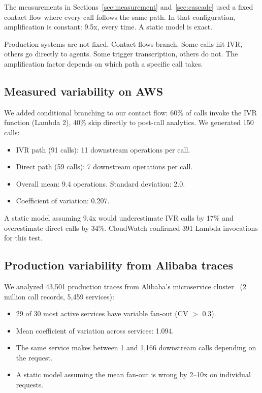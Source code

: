 \documentclass{article}
\begin{document}
The measurements in Sections~\ref{sec:measurement} and~\ref{sec:cascade} used a fixed contact flow where every call follows the same path. In that configuration, amplification is constant: 9.5x, every time. A static model is exact.

Production systems are not fixed. Contact flows branch. Some calls hit IVR, others go directly to agents. Some trigger transcription, others do not. The amplification factor depends on which path a specific call takes.

\subsection{Measured variability on AWS}

We added conditional branching to our contact flow: 60\% of calls invoke the IVR function (Lambda 2), 40\% skip directly to post-call analytics. We generated 150 calls:

\begin{itemize}
  \item IVR path (91 calls): 11 downstream operations per call.
  \item Direct path (59 calls): 7 downstream operations per call.
  \item Overall mean: 9.4 operations. Standard deviation: 2.0.
  \item Coefficient of variation: 0.207.
\end{itemize}

A static model assuming 9.4x would underestimate IVR calls by 17\% and overestimate direct calls by 34\%. CloudWatch confirmed 391 Lambda invocations for this test.

\subsection{Production variability from Alibaba traces}

We analyzed 43,501 production traces from Alibaba's microservice cluster~\citep{luo2021} (2 million call records, 5,459 services):

\begin{itemize}
  \item 29 of 30 most active services have variable fan-out (CV $>$ 0.3).
  \item Mean coefficient of variation across services: 1.094.
  \item The same service makes between 1 and 1,166 downstream calls depending on the request.
  \item A static model assuming the mean fan-out is wrong by 2--10x on individual requests.
\end{itemize}
\end{document}
